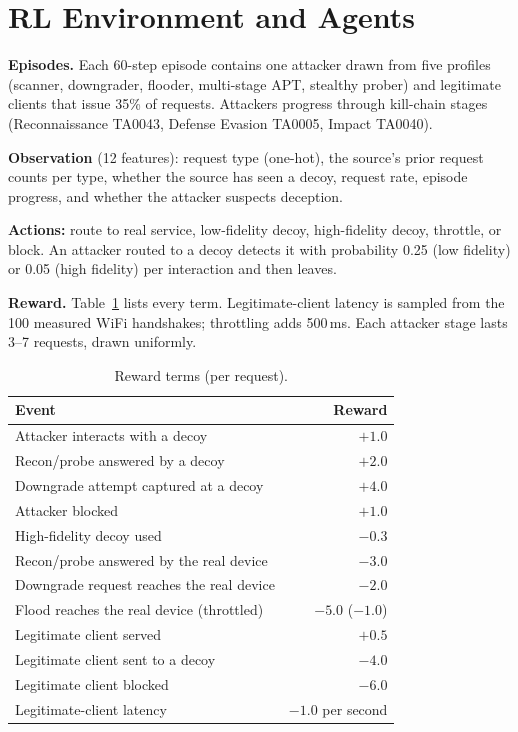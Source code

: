 \documentclass[conference]{IEEEtran}
\begin{document}
\section{RL Environment and Agents}
\textbf{Episodes.} Each 60-step episode contains one attacker drawn from five
profiles (scanner, downgrader, flooder, multi-stage APT, stealthy prober) and
legitimate clients that issue 35\% of requests. Attackers progress through
kill-chain stages (Reconnaissance TA0043, Defense Evasion TA0005, Impact TA0040).

\textbf{Observation} (12 features): request type (one-hot), the source's prior
request counts per type, whether the source has seen a decoy, request rate,
episode progress, and whether the attacker suspects deception.

\textbf{Actions:} route to real service, low-fidelity decoy, high-fidelity decoy,
throttle, or block. An attacker routed to a decoy detects it with probability
0.25 (low fidelity) or 0.05 (high fidelity) per interaction and then leaves.

\textbf{Reward.} Table~\ref{tab:reward} lists every term. Legitimate-client
latency is sampled from the 100 measured WiFi handshakes; throttling adds 500\,ms.
Each attacker stage lasts 3--7 requests, drawn uniformly.

\begin{table}[t]
\centering
\caption{Reward terms (per request).}
\label{tab:reward}
\begin{tabular}{lr}
\toprule
Event & Reward \\
\midrule
Attacker interacts with a decoy & $+1.0$ \\
Recon/probe answered by a decoy & $+2.0$ \\
Downgrade attempt captured at a decoy & $+4.0$ \\
Attacker blocked & $+1.0$ \\
High-fidelity decoy used & $-0.3$ \\
Recon/probe answered by the real device & $-3.0$ \\
Downgrade request reaches the real device & $-2.0$ \\
Flood reaches the real device (throttled) & $-5.0$ ($-1.0$) \\
Legitimate client served & $+0.5$ \\
Legitimate client sent to a decoy & $-4.0$ \\
Legitimate client blocked & $-6.0$ \\
Legitimate-client latency & $-1.0$ per second \\
\bottomrule
\end{tabular}
\end{table}
\end{document}
